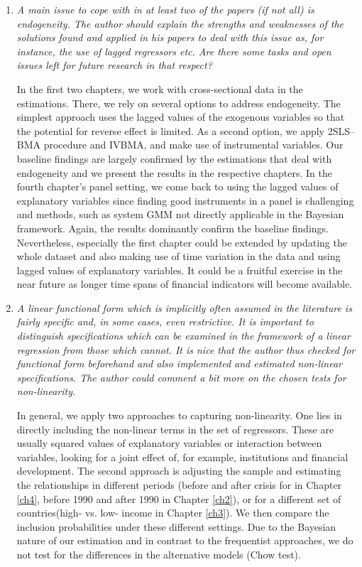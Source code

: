 \begin{enumerate}
    \item \textit{A main issue to cope with in at least two of the papers (if not all) is endogeneity. The author should explain the strengths and weaknesses of the solutions found and applied in his papers to deal with this issue as, for instance, the use of lagged regressors etc. Are there some tasks and open issues left for future research in that respect?}
    
    In the first two chapters, we work with cross-sectional data in the estimations. There, we rely on several options to address endogeneity. The simplest approach uses the lagged values of the exogenous variables so that the potential for reverse effect is limited. As a second option, we apply 2SLS--BMA procedure and \ac{IVBMA}, and make use of instrumental variables. Our baseline findings are largely confirmed by the estimations that deal with endogeneity and we present the results in the respective chapters. In the fourth chapter's panel setting, we come back to using the lagged values of explanatory variables since finding good instruments in a panel is challenging and methods, such as system GMM not directly applicable in the Bayesian framework. Again, the results dominantly confirm the baseline findings. Nevertheless, especially the first chapter could be extended by updating the whole dataset and also making use of time variation in the data and using lagged values of explanatory variables. It could be a fruitful exercise in the near future as longer time spans of financial indicators will become available. 

    \item \textit{A linear functional form which is implicitly often assumed in the literature is fairly specific and, in some cases, even restrictive. It is important to distinguish specifications which can be examined in the framework of a linear regression from those which cannot. It is nice that the author thus checked for functional form beforehand and also implemented and estimated non-linear specifications. The author could comment a bit more on the chosen tests for non-linearity.}
    
    In general, we apply two approaches to capturing non-linearity. One lies in directly including the non-linear terms in the set of regressors. These are usually squared values of explanatory variables or interaction between variables, looking for a joint effect of, for example, institutions and financial development. The second approach is adjusting the sample and estimating the relationships in different periods (before and after crisis for in Chapter \ref{ch4}, before 1990 and after 1990 in Chapter \ref{ch2}), or for a different set of countries(high- vs. low- income in Chapter \ref{ch3}). We then compare the inclusion probabilities under these different settings. Due to the Bayesian nature of our estimation and in contrast to the frequentist approaches, we do not test for the differences in the alternative models (Chow test).


\end{enumerate}
